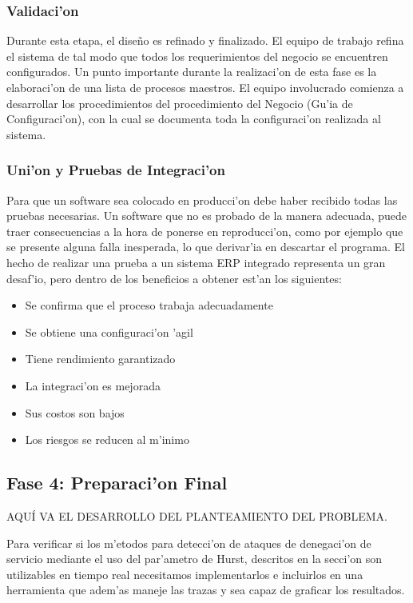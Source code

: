\subsubsection{Validaci'on}
	Durante esta etapa, el dise\~no es refinado y finalizado. El equipo de trabajo refina el sistema de tal modo que todos los requerimientos del negocio se encuentren configurados. 
	Un punto importante durante la realizaci'on de esta fase es la elaboraci'on de una lista de procesos maestros. 	El equipo involucrado comienza a desarrollar los procedimientos del procedimiento del Negocio (Gu'ia de Configuraci'on), con la cual se documenta toda la configuraci'on realizada al sistema. 
\subsubsection{Uni'on y Pruebas de Integraci'on}
	Para que un software sea colocado en producci'on debe haber recibido todas las pruebas necesarias. Un software que no es probado de la manera adecuada, puede traer consecuencias a la hora de ponerse en reproducci'on, como por ejemplo que se presente alguna falla inesperada, lo que derivar'ia en descartar el programa.
	El hecho de realizar una prueba a un sistema ERP integrado representa un gran desaf'io, pero dentro de los beneficios a obtener est'an los siguientes: 
\begin{itemize}
\item Se confirma que el proceso trabaja adecuadamente
\item Se obtiene una configuraci'on 'agil
\item Tiene rendimiento garantizado
\item La integraci'on es mejorada
\item Sus costos son bajos
\item Los riesgos se reducen al m'inimo
\end{itemize}
\subsection{Fase 4: Preparaci'on Final}

AQU\'I VA EL DESARROLLO DEL PLANTEAMIENTO DEL PROBLEMA.
\vspace{5 mm}

Para verificar si los m'etodos para detecci'on de ataques de denegaci'on de
servicio mediante el uso del par'ametro de Hurst, descritos en la secci'on
son utilizables en tiempo real necesitamos implementarlos e incluirlos en 
una herramienta que adem'as maneje las trazas y sea capaz de graficar los resultados. 


